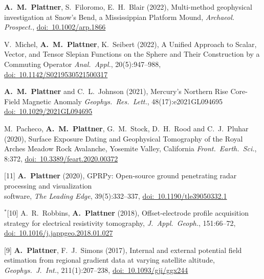 \documentclass[10pt]{article}
\begin{document}

\spcp
\shift[15] \textbf{A.~M.~Plattner}, S.~Filoromo, E.~H.~Blair (2022), Multi-method geophysical
investigation at Snow's Bend, a Mississippian Platform Mound,
\emph{Archaeol. Prospect.}, \href{https://doi.org/10.1002/arp.1866}{doi:~10.1002/arp.1866}

\spcp
\shift[14] V.~Michel, \textbf{A.~M.~Plattner}, K.~Seibert (2022),
A Unified Approach to Scalar, Vector, and Tensor Slepian Functions on the Sphere and Their Construction by a Commuting Operator
\emph{Anal.~Appl.}, 20(5):947--988, \href{https://doi.org/10.1142/S0219530521500317}{doi:~10.1142/S0219530521500317}

\spcp
\shift[13] \textbf{A.~M.~Plattner} and C.\ L.~Johnson (2021),
Mercury's Northern Rise Core-Field Magnetic Anomaly
\emph{Geophys.~Res.~Lett.}, 48(17):e2021GL094695 \href{https://doi.org/10.1029/2021GL094695}{doi:~10.1029/2021GL094695}

\spcp
\grshift \gr[12] M.~Pacheco, \textbf{A.~M.~Plattner}, G.~M.~Stock, D.~H.~Rood and C.~J.~Pluhar (2020),
Surface Exposure Dating and Geophysical Tomography of the Royal Arches Meadow Rock Avalanche, Yosemite Valley, California
\emph{Front.~Earth.~Sci.}, 8:372, \href{https://www.frontiersin.org/articles/10.3389/feart.2020.00372/full}{doi:~10.3389/feart.2020.00372} 

\spcp
\hspace{-0.675cm}[11] \textbf{A.~Plattner} (2020), GPRPy: Open-source ground penetrating radar processing and visualization \\software, \emph{The Leading Edge}, 39(5):332--337, \href{https://doi.org/10.1190/tle39050332.1}{doi:~10.1190/tle39050332.1}

\spcp
\hspace{-0.835cm}$^*$[10] A.~R.~Robbins, \textbf{A.~Plattner} (2018),
Offset-electrode profile acquisition strategy for
electrical resistivity tomography,
\emph{J.~Appl.~Geoph.}, 151:66--72, \href{https://www.sciencedirect.com/science/article/pii/S0926985117308376?via%3Dihub}{doi:~10.1016/j.jappgeo.2018.01.027} 


\spcp
\hspace{-0.5cm}[9] \textbf{A.~Plattner}, F.~J.~Simons (2017),
Internal and external potential field estimation
from regional gradient data at varying satellite altitude,
\emph{Geophys.~J.~Int.}, 211(1):207--238, \href{https://academic.oup.com/gji/article-lookup/doi/10.1093/gji/ggx244}{doi:~10.1093/gji/ggx244} 
\end{document}
